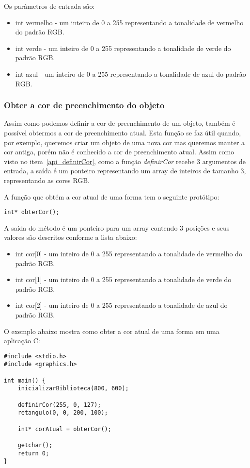 \documentclass[12pt, %
openright,
oneside, %
a4paper,    %
brazil]{facom-ufu-abntex2}
\begin{document}
Os parâmetros de entrada são:

\begin{itemize}
    \item int vermelho - um inteiro de 0 a 255 representando a tonalidade de vermelho do padrão RGB.
    \item int verde - um inteiro de 0 a 255 representando a tonalidade de verde do padrão RGB.
    \item int azul - um inteiro de 0 a 255 representando a tonalidade de azul do padrão RGB.
\end{itemize}

\subsubsection{Obter a cor de preenchimento do objeto}
Assim como podemos definir a cor de preenchimento de um objeto, também é possível obtermos a cor de preenchimento atual. Esta função se faz útil quando, por exemplo, queremos criar um objeto de uma nova cor mas queremos manter a cor antiga, porém não é conhecido a cor de preenchimento atual. Assim como visto no item~\ref{api_definirCor}, como a função \textit{definirCor} recebe 3 argumentos de entrada, a saída é um ponteiro representando um array de inteiros de tamanho 3, representando as cores RGB.

A função que obtém a cor atual de uma forma tem o seguinte protótipo:

\begin{verbatim}
int* obterCor();
\end{verbatim}

A saída do método é um ponteiro para um array contendo 3 posições e seus valores são descritos conforme a lista abaixo:

\begin{itemize}
    \item int cor[0] - um inteiro de 0 a 255 representando a tonalidade de vermelho do padrão RGB.
    \item int cor[1] - um inteiro de 0 a 255 representando a tonalidade de verde do padrão RGB.
    \item int cor[2] - um inteiro de 0 a 255 representando a tonalidade de azul do padrão RGB.
\end{itemize}

O exemplo abaixo mostra como obter a cor atual de uma forma em uma aplicação C:

\begin{verbatim}
#include <stdio.h>
#include <graphics.h>

int main() {
    inicializarBiblioteca(800, 600);

    definirCor(255, 0, 127);
    retangulo(0, 0, 200, 100);

    int* corAtual = obterCor();

    getchar();
    return 0;
}
\end{verbatim}
\end{document}
